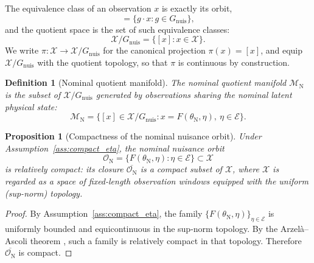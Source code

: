 \documentclass[a4paper]{cas-sc}
\newtheorem{definition}{Definition}
\newtheorem{proposition}{Proposition}
\newcommand{\X}{\ensuremath{\mathcal{X}}}
\newcommand{\EtaSpace}{\ensuremath{\mathcal{E}}}
\newcommand{\Mnominal}{\ensuremath{\mathcal{M}_{\mathrm{N}}}}
\newcommand{\Gnuis}{\ensuremath{G_{\mathrm{nuis}}}}
\newcommand{\quotient}{\ensuremath{\mathcal{X}/G_{\mathrm{nuis}}}}
\begin{document}
The equivalence class of an observation \(x\) is exactly its orbit,
\begin{equation}
[x] = \{g \cdot x : g \in \Gnuis\},
\label{eq:orbit}
\end{equation}
and the quotient space is the set of such equivalence classes:
\begin{equation}
\quotient = \{[x] : x \in \X\}.
\label{eq:quotient}
\end{equation}
We write \(\pi:\X\to\quotient\) for the canonical projection
\(\pi(x)=[x]\), and equip \(\quotient\) with the quotient topology, so that
\(\pi\) is continuous by construction.

\begin{definition}[Nominal quotient manifold]
\label{def:nominal_quotient_manifold}
The \emph{nominal quotient manifold} \(\Mnominal\) is the subset of
\(\quotient\) generated by observations sharing the nominal latent physical
state:
\begin{equation}
\Mnominal
=
\bigl\{[x] \in \quotient : x = F(\theta_{\mathrm{N}},\eta),
\ \eta \in \EtaSpace\bigr\}.
\label{eq:nominal_manifold}
\end{equation}
\end{definition}

\begin{proposition}[Compactness of the nominal nuisance orbit]
\label{prop:compactness}
Under Assumption~\ref{ass:compact_eta}, the nominal nuisance orbit
\[
\mathcal{O}_{\mathrm N}
=
\bigl\{ F(\theta_{\mathrm N},\eta) : \eta \in \EtaSpace \bigr\}
\subset \X
\]
is relatively compact: its closure \(\overline{\mathcal{O}_{\mathrm N}}\) is
a compact subset of \(\X\), where \(\X\) is regarded as a space of
fixed-length observation windows equipped with the uniform (sup-norm)
topology.
\end{proposition}

\begin{proof}
By Assumption~\ref{ass:compact_eta}, the family
\(\{F(\theta_{\mathrm N},\eta)\}_{\eta\in\EtaSpace}\)
is uniformly bounded and equicontinuous in the sup-norm topology. By the
Arzel\`a--Ascoli theorem \citep[Thm.~7.25]{rudin1976}, such a family is
relatively compact in that topology. Therefore
\(\overline{\mathcal{O}_{\mathrm N}}\) is compact.
\end{proof}
\end{document}
